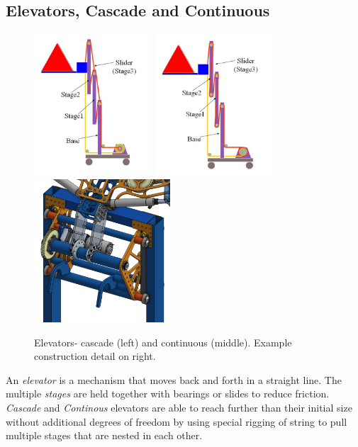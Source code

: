 \subsection{Elevators, Cascade and Continuous}
\begin{figure}[H]
	\includegraphics[height=2.1in]{imgs/elevator_cascade.jpeg}
	\includegraphics[height=2.1in]{imgs/elevator_continuous.jpeg}
	\includegraphics[height=2.1in]{imgs/elevator_construction.png}
	\caption{Elevators- cascade (left) and continuous (middle). Example construction detail on right.}
\end{figure}

An \textit{elevator} is a mechanism that moves back and forth in a straight line. The multiple \textit{stages} are held together with bearings or slides to reduce friction. \textit{Cascade} and \textit{Continous} elevators are able to reach further than their initial size without additional degrees of freedom by using special rigging of string to pull multiple stages that are nested in each other.

